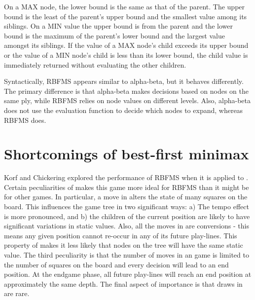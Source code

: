On a MAX node, the lower bound is the same as that of the parent.  The upper bound is the least of the parent's upper bound and the smallest value among its siblings.  On a MIN value the upper bound is from the parent and the lower bound is the maximum of the parent's lower bound and the largest value amongst its siblings.  If the value of a MAX node's child exceeds its upper bound or the value of a MIN node's child is less than its lower bound, the child value is immediately returned without evaluating the other children.

Syntactically, RBFMS appears similar to alpha-beta, but it behaves differently.  The primary difference is that alpha-beta makes decisions based on nodes on the same ply, while RBFMS relies on node values on different levels.  Also, alpha-beta does not use the evaluation function to decide which nodes to expand, whereas RBFMS does.

\section{Shortcomings of best-first minimax}
\label{sec:tree-shortcomings}
Korf and Chickering explored the performance of RBFMS when it is applied to .  Certain peculiarities of  makes this game more ideal for RBFMS than it might be for other games.  In particular, a move in  alters the state of many squares on the board.  This influences the game tree in two significant ways: a) The tempo effect is more pronounced, and b)  the children of the current position are likely to have significant variations in static values.  Also, all the moves in  are conversions - this means any given position cannot re-occur in any of its future play-lines.  This property of  makes it less likely that nodes on the tree will have the same static value.  The third peculiarity is that the number of moves in an  game is limited to the number of squares on the board and every decision will lead to an end position.  At the endgame phase, all future play-lines will reach an end position at approximately the same depth.  The final aspect of importance is that draws in  are rare.

